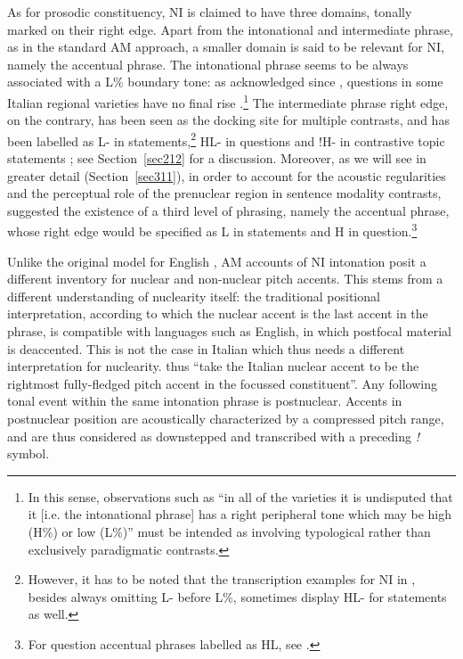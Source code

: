 As for prosodic constituency, NI is claimed to have three domains, tonally marked on their right edge. Apart from the intonational and intermediate phrase, as in the standard AM approach, a smaller domain is said to be relevant for NI, namely the accentual phrase. The intonational phrase seems to be always associated with a L\% boundary tone: as acknowledged since \citet{grice1991intonation}, questions in some Italian regional varieties have no final rise \citep{savino2012intonation}.\footnote{In this sense, observations such as ``in all of the varieties it is undisputed that it [i.e. the intonational phrase] has a right peripheral tone which may be high (H\%) or low (L\%)'' \cite[373]{grice2005strategy} must be intended as involving typological rather than exclusively paradigmatic contrasts.} The intermediate phrase right edge, on the contrary, has been seen as the docking site for multiple contrasts, and has been labelled as L- in statements,\footnote{However, it has to be noted that the transcription examples for NI in \citet{grice2005strategy}, besides always omitting L- before L\%, sometimes display HL- for statements as well.} HL- in questions \citep{dimperio2001focus} and !H- in contrastive topic statements \citep{dimperio2011phrasing}; see Section~\ref{sec212} for a discussion. Moreover, as we will see in greater detail (Section~\ref{sec311}), in order to account for the acoustic regularities and the perceptual role of the prenuclear region in sentence modality contrasts, \citet{petrone2011tones} suggested the existence of a third level of phrasing, namely the accentual phrase, whose right edge would be specified as L in statements and H in question.\footnote{For question accentual phrases labelled as HL, see \citet{petrone2008tonal}.}

Unlike the original model for English \citep{pierrehumbert1980phonology}, AM accounts of NI intonation posit a different inventory for nuclear and non-nuclear pitch accents. This stems from a different understanding of nuclearity itself: the traditional positional interpretation, according to which the nuclear accent is the last accent in the phrase, is compatible with languages such as English, in which postfocal material is deaccented. This is not the case in Italian \citep{swerts1999reaccentuation} which thus needs a different interpretation for nuclearity. \citet[380]{grice2005strategy} thus ``take the Italian nuclear accent to be the rightmost fully-fledged pitch accent in the focussed constituent''. Any following tonal event within the same intonation phrase is postnuclear. Accents in postnuclear position are acoustically characterized by a compressed pitch range, and are thus considered as downstepped and transcribed with a preceding \textit{!} symbol.


